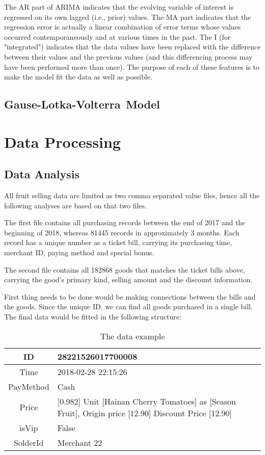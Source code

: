 \documentclass{mcmthesis}
\begin{document}
The AR part of ARIMA indicates that the evolving variable of interest is regressed on its own lagged (i.e., prior) values. The MA part indicates that the regression error is actually a linear combination of error terms whose values occurred contemporaneously and at various times in the past. The I (for "integrated") indicates that the data values have been replaced with the difference between their values and the previous values (and this differencing process may have been performed more than once). The purpose of each of these features is to make the model fit the data as well as possible.

\subsection{Gause-Lotka-Volterra Model}

\section{Data Processing}

\subsection{Data Analysis}

All fruit selling data are limited as two comma separated value files,
hence all the following analyses are based on that two files.

The first file contains all purchasing records between the end of 2017 and the beginning of 2018, whereas 81445 records in approximately 3 months. Each record has a unique number as a ticket bill, carrying its purchasing time, merchant ID, paying method and special bonus.

The second file contains all 182868 goods that matches the ticket bills above, carrying the good's primary kind, selling amount and the discount information.

First thing needs to be done would be making connections between the bills and the goods. Since the unique ID, we can find all goods purchased in a single bill. The
final data would be fitted in the following structure:

\begin{table}[h]
    \centering
    \caption{The data example} \label{table-data_example}
    \begin{tabular}{|c|p{20em}|}
    \hline
        ID & 28221526017700008\\
    \hline
        Time & 2018-02-28 22:15:26\\
    \hline
        PayMethod & Cash\\
    \hline
        Price & [0.982] Unit [Hainan Cherry Tomatoes] as [Season Fruit], Origin price [12.90] Discount Price [12.90]\\
    \hline
        isVip & False\\
    \hline
        SolderId & Merchant 22\\
    \hline
    \end{tabular}
\end{table}
\end{document}
